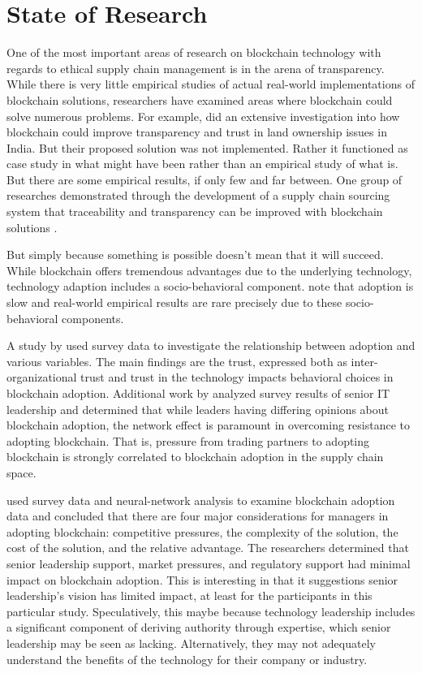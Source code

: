 \documentclass[man]{apa7}
\begin{document}
\section{State of Research}
\label{sec:orged5ec5c}

One of the most important areas of research on blockchain technology with
regards to ethical supply chain management is in the arena of transparency.
While there is very little empirical studies of actual real-world
implementations of blockchain solutions, researchers have examined areas where
blockchain could solve numerous problems. For example,
\textcite{thakurLandRecordsBlockchain2020} did an extensive investigation into how
blockchain could improve transparency and trust in land ownership issues in
India. But their proposed solution was not implemented. Rather it functioned as
case study in what might have been rather than an empirical study of what is.
But there are some empirical results, if only few and far between. One group of
researches demonstrated through the development of a supply chain sourcing
system that traceability and transparency can be improved with blockchain
solutions \parencite{luAdaptableBlockchainBasedSystems2017}. 

But simply because something is possible doesn't mean that it will succeed.
While blockchain offers tremendous advantages due to the underlying technology,
technology adaption includes a socio-behavioral component.
\Textcite{kristofferfranciscoSupplyChainHas2018} note that adoption is slow and
real-world empirical results are rare precisely due to these socio-behavioral
components.

A study by \textcite{alazabBlockchainTechnologySupply2020} used survey data to
investigate the relationship between adoption and various variables. The main
findings are the trust, expressed both as inter-organizational trust and trust
in the technology impacts behavioral choices in blockchain adoption. Additional
work by \parencite{fossowambaDynamicsBlockchainAdoption2020} analyzed survey results of
senior IT leadership and determined that while leaders having differing opinions
about blockchain adoption, the network effect is paramount in overcoming
resistance to adopting blockchain. That is, pressure from trading partners to
adopting blockchain is strongly correlated to blockchain adoption in the supply chain
space.   

\Textcite{wongTimeSeizeDigital2020} used survey data and neural-network analysis
to examine blockchain adoption data and concluded that there are four major
considerations for managers in adopting blockchain: competitive pressures, the
complexity of the solution, the cost of the solution, and the relative
advantage. The researchers determined that senior leadership support, market
pressures, and regulatory support had minimal impact on blockchain adoption.
This is interesting in that it suggestions senior leadership's vision has
limited impact, at least for the participants in this particular study.
Speculatively, this maybe because technology leadership includes a significant
component of deriving authority through expertise, which senior leadership may
be seen as lacking. Alternatively, they may not adequately understand the
benefits of the technology for their company or industry.
\end{document}
